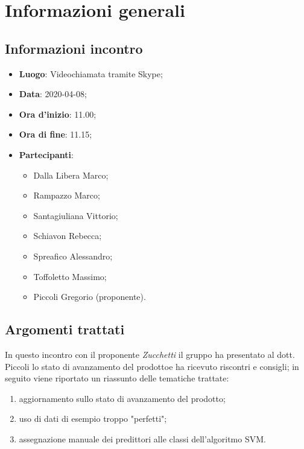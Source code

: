 \section{Informazioni generali}
    \subsection{Informazioni incontro}
        \begin{itemize}
            \item \textbf{Luogo}: Videochiamata tramite Skype;
            \item \textbf{Data}: 2020-04-08;
            \item \textbf{Ora d'inizio}: 11.00;
            \item \textbf{Ora di fine}: 11.15;
            \item \textbf{Partecipanti}: 
            \begin{itemize}
                \item Dalla Libera Marco;
                \item Rampazzo Marco;
                \item Santagiuliana Vittorio;
                \item Schiavon Rebecca;
                \item Spreafico Alessandro;
                \item Toffoletto Massimo;
                \item Piccoli Gregorio (proponente).
            \end{itemize}
        \end{itemize}
    \subsection{Argomenti trattati}
        In questo incontro con il proponente \textit{Zucchetti} il gruppo ha presentato al dott. Piccoli lo stato di avanzamento del prodotto\glosp e ha ricevuto riscontri e consigli; in seguito viene riportato un riassunto delle tematiche trattate:
        \begin{enumerate}
            \item aggiornamento sullo stato di avanzamento del prodotto\glo;
            \item uso di dati di esempio troppo "perfetti";
            \item assegnazione manuale dei predittori alle classi dell'algoritmo SVM\glo.
        \end{enumerate}
